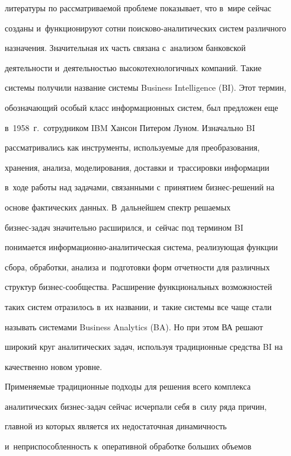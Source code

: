 литературы по рассматриваемой проблеме показывает, что в~мире сейчас 


созданы и~функционируют сотни поисково-аналитических систем различного 


назначения. Значительная их часть связана с~анализом банковской 


деятельности и~деятельностью высокотехнологичных компаний. Такие 


системы получили название системы Business Intelligence (BI). Этот термин, 


обозначающий особый класс информационных систем, был предложен еще 


в~1958~г.\ сотрудником IBM Хан\-сон Питером Луном. Изначально BI 


рассматривались как инструменты, используемые для преобразования, 


хранения, анализа, моделирования, доставки и~трассировки информации 


в~ходе работы над задачами, связанными с~принятием биз\-нес-ре\-ше\-ний на 


основе фактических данных. В~дальнейшем спектр решаемых  


биз\-нес-за\-дач значительно расширился, и~сейчас под термином BI 


понимается ин\-фор\-ма\-ци\-он\-но-ана\-ли\-ти\-че\-ская сис\-те\-ма, реализующая функции 


сбора, обработки, анализа и~подготовки форм отчетности для различных 


структур биз\-нес-со\-об\-ще\-ст\-ва. Расширение функциональных возможностей 


таких систем отразилось в~их названии, и~такие системы все чаще стали 


называть системами Business Analytics (BA). Но при этом ВА решают 


широкий круг аналитических задач, используя традиционные средства BI на 


качественно новом уровне.


     


     Применяемые традиционные подходы для решения всего комплекса 


аналитических бизнес-задач сейчас исчерпали себя в~силу ряда причин, 


главной из которых является их недостаточная динамичность 


и~неприспособленность к~оперативной обработке больших объемов 


